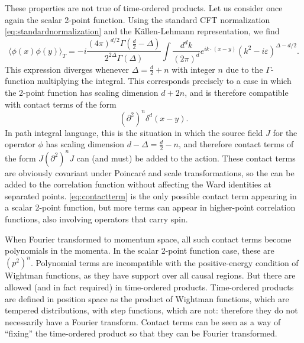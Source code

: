 \documentclass[a4paper,12pt]{article}
\numberwithin{equation}{section}
\begin{document}
These properties are not true of time-ordered products. Let us consider once again the scalar 2-point function. Using the standard CFT normalization \eqref{eq:standardnormalization} and the Källen-Lehmann representation, we find
\begin{equation}
	\langle \phi(x) \phi(y) \rangle_T
	= -i
	\frac{(4\pi)^{d/2} \Gamma\left( \frac{d}{2} - \Delta \right)}
	{2^{2\Delta} \Gamma(\Delta)}
	\int \frac{d^dk}{(2\pi)^d}
	e^{i k \cdot (x - y)}
	\left( k^2 - i \varepsilon \right)^{\Delta - d/2}.
	\label{eq:UVdivergence}
\end{equation}
This expression diverges whenever $\Delta = \frac{d}{2} + n$ with integer $n$ due to the $\Gamma$-function multiplying the integral.
This corresponds precisely to a case in which the 2-point function has scaling dimension $d + 2n$, and is therefore compatible with contact terms of the form
\begin{equation}
	(\partial^2)^n \delta^d(x - y).
	\label{eq:contactterm}
\end{equation}
In path integral language, this is the situation in which the source field $J$ for the operator $\phi$ has scaling dimension $d - \Delta = \frac{d}{2} - n$, and therefore contact terms of the form $J (\partial^2)^n J$ can (and must) be added to the action. 
These contact terms are obviously covariant under Poincaré and scale transformations, so the can be added to the correlation function without affecting the Ward identities at separated points.
\eqref{eq:contactterm} is the only possible contact term appearing in a scalar 2-point function, but more terms can appear in higher-point correlation functions, also involving operators that carry spin.

When Fourier transformed to momentum space, all such contact terms become polynomials in the momenta. In the scalar 2-point function case, these are $(p^2)^n$. Polynomial terms are incompatible with the positive-energy condition of Wightman functions, as they have support over all causal regions. But there are allowed (and in fact required) in time-ordered products. Time-ordered products are defined in position space as the product of Wightman functions, which are tempered distributions, with step functions, which are not: therefore they do not necessarily have a Fourier transform. Contact terms can be seen as a way of ``fixing'' the time-ordered product so that they can be Fourier transformed. 
\end{document}
